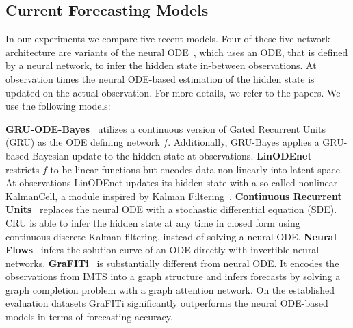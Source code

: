 \subsection{Current Forecasting Models}
In our experiments we compare five recent models.
Four of these five network architecture are variants of the neural
ODE~\citep{Chen2018.Neurald}, which uses an ODE, that is defined by a neural network, to infer the hidden state in-between observations. At
observation times the
neural ODE-based estimation of the hidden state is updated on the actual observation.
For more details, we refer to the papers. We use the following models:

\textbf{GRU-ODE-Bayes}~\citep{DeBrouwer2019.GRUODEBayesd}
utilizes a continuous version of Gated Recurrent Units (GRU) as
the ODE defining network $f$.
Additionally, GRU-Bayes applies a GRU-based Bayesian update to the
hidden state at observations.
\textbf{LinODEnet}~\citep{Scholz2022.Latenta} restricts $f$ to be linear functions but encodes data non-linearly into latent space.
 At observations LinODEnet updates its hidden state with a so-called nonlinear KalmanCell, a module inspired by
Kalman Filtering~\citep{Kalman1960.New}.
\textbf{Continuous Recurrent Units}~\citep{Schirmer2022.Modelingb} replaces the neural ODE with
 a stochastic differential equation (SDE). CRU is able to infer the hidden state
 at any time in closed form using continuous-discrete Kalman filtering,
 instead of solving a neural ODE\@.
\textbf{Neural Flows}~\citep{Bilos2021.Neurald} infers the solution curve of an ODE directly with
invertible neural networks.
\textbf{GraFITi}~\citep{Yalavarthi2024.GraFITi} is substantially different from neural ODE\@. It
encodes the observations from IMTS into a graph structure and infers forecasts by solving a
graph completion problem with a graph attention network. On the established evaluation datasets
GraFITi significantly outperforms the neural ODE-based models in terms of forecasting accuracy.
